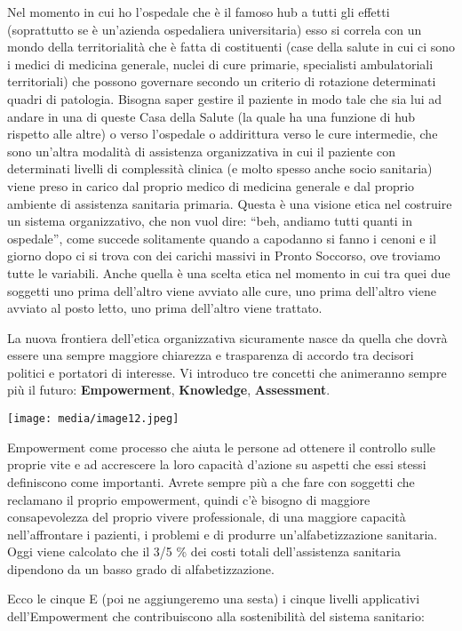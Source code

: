 \documentclass[]{article}
\begin{document}
Nel momento in cui ho l'ospedale che è il famoso hub a tutti gli effetti
(soprattutto se è un'azienda ospedaliera universitaria) esso si correla
con un mondo della territorialità che è fatta di costituenti (case della
salute in cui ci sono i medici di medicina generale, nuclei di cure
primarie, specialisti ambulatoriali territoriali) che possono governare
secondo un criterio di rotazione determinati quadri di patologia.
Bisogna saper gestire il paziente in modo tale che sia lui ad andare in
una di queste Casa della Salute (la quale ha una funzione di hub
rispetto alle altre) o verso l'ospedale o addirittura verso le cure
intermedie, che sono un'altra modalità di assistenza organizzativa in
cui il paziente con determinati livelli di complessità clinica (e molto
spesso anche socio sanitaria) viene preso in carico dal proprio medico
di medicina generale e dal proprio ambiente di assistenza sanitaria
primaria. Questa è una visione etica nel costruire un sistema
organizzativo, che non vuol dire: ``beh, andiamo tutti quanti in
ospedale'', come succede solitamente quando a capodanno si fanno i
cenoni e il giorno dopo ci si trova con dei carichi massivi in Pronto
Soccorso, ove troviamo tutte le variabili. Anche quella è una scelta
etica nel momento in cui tra quei due soggetti uno prima dell'altro
viene avviato alle cure, uno prima dell'altro viene avviato al posto
letto, uno prima dell'altro viene trattato.

La nuova frontiera dell'etica organizzativa sicuramente nasce da quella
che dovrà essere una sempre maggiore chiarezza e trasparenza di accordo
tra decisori politici e portatori di interesse. Vi introduco tre
concetti che animeranno sempre più il futuro: \textbf{Empowerment},
\textbf{Knowledge}, \textbf{Assessment}.

\texttt{[image: media/image12.jpeg]}

Empowerment come processo che aiuta le persone ad ottenere il controllo
sulle proprie vite e ad accrescere la loro capacità d'azione su aspetti
che essi stessi definiscono come importanti. Avrete sempre più a che
fare con soggetti che reclamano il proprio empowerment, quindi c'è
bisogno di maggiore consapevolezza del proprio vivere professionale, di
una maggiore capacità nell'affrontare i pazienti, i problemi e di
produrre un'alfabetizzazione sanitaria. Oggi viene calcolato che il 3/5
\% dei costi totali dell'assistenza sanitaria dipendono da un basso
grado di alfabetizzazione.

Ecco le cinque E (poi ne aggiungeremo una sesta) i cinque livelli
applicativi dell'Empowerment che contribuiscono alla sostenibilità del
sistema sanitario:
\end{document}
